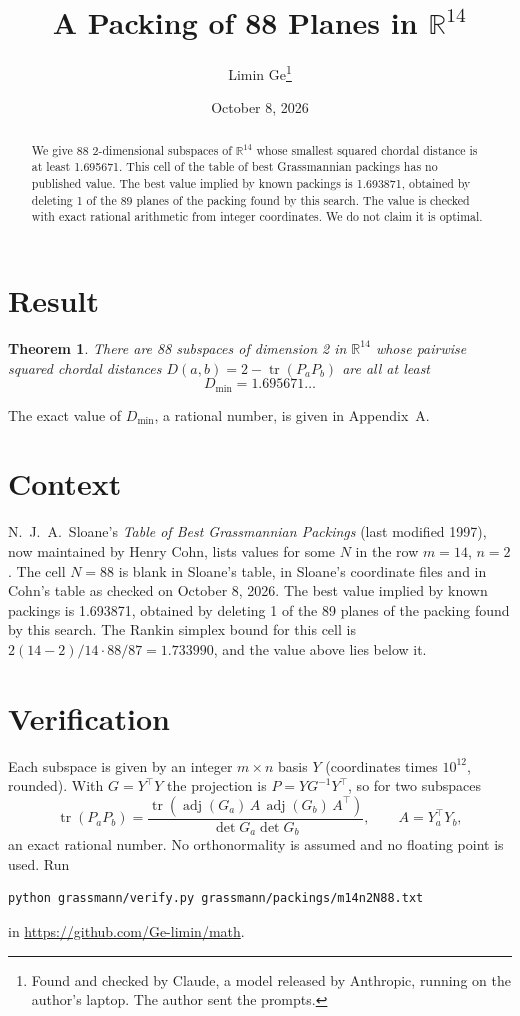 \documentclass[11pt,a4paper]{article}
\title{A Packing of 88 Planes in $\mathbb{R}^{14}$}
\author{Limin Ge\thanks{Found and checked by Claude, a model released by Anthropic, running on the author's laptop. The author sent the prompts.}}
\date{October 8, 2026}
\newtheorem*{theorem}{Theorem}
\begin{document}
\maketitle
\begin{abstract}
We give 88 2-dimensional subspaces of $\mathbb{R}^{14}$ whose smallest squared chordal distance is at least 1.695671. This cell of the table of best Grassmannian packings has no published value. The best value implied by known packings is 1.693871, obtained by deleting 1 of the 89 planes of the packing found by this search. The value is checked with exact rational arithmetic from integer coordinates. We do not claim it is optimal.
\end{abstract}

\section{Result}
\begin{theorem}
There are 88 subspaces of dimension 2 in $\mathbb{R}^{14}$ whose pairwise squared chordal distances $D(a,b) = 2 - \operatorname{tr}(P_aP_b)$ are all at least
\[ D_{\min} = 1.695671\ldots \]
\end{theorem}
The exact value of $D_{\min}$, a rational number, is given in Appendix~A.


\section{Context}
N.~J.~A.~Sloane's \emph{Table of Best Grassmannian Packings} (last modified 1997), now maintained by Henry Cohn, lists values for some $N$ in the row $m=14$, $n=2$. The cell $N=88$ is blank in Sloane's table, in Sloane's coordinate files and in Cohn's table as checked on October 8, 2026. The best value implied by known packings is 1.693871, obtained by deleting 1 of the 89 planes of the packing found by this search. The Rankin simplex bound for this cell is $2(14-2)/14\cdot 88/87 = 1.733990$, and the value above lies below it.


\section{Verification}
Each subspace is given by an integer $m\times n$ basis $Y$ (coordinates times $10^{12}$, rounded). With $G=Y^\top Y$ the projection is $P=YG^{-1}Y^\top$, so for two subspaces
\[ \operatorname{tr}(P_aP_b)=\frac{\operatorname{tr}(\operatorname{adj}(G_a)\,A\,\operatorname{adj}(G_b)\,A^\top)}{\det G_a\det G_b},\qquad A=Y_a^\top Y_b, \]
an exact rational number. No orthonormality is assumed and no floating point is used. Run
\begin{verbatim}
python grassmann/verify.py grassmann/packings/m14n2N88.txt
\end{verbatim}
in \url{https://github.com/Ge-limin/math}.
\end{document}
